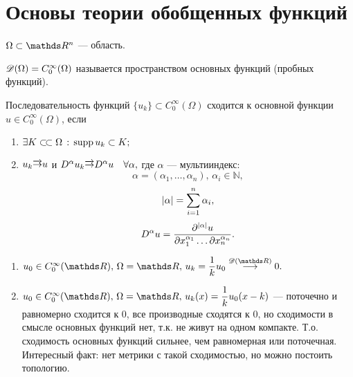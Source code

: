 
\section{Основы теории обобщенных функций}
$\Omega \subset \real^n$ --- область.

\begin{definition}
$ \mathscr{D}(\Omega) = C_0^\infty(\Omega)$ называется пространством основных функций (пробных функций).
\end{definition}

\begin{definition}
Последовательность функций $\{u_k\} \subset C_0^\infty(\Omega)$ сходится к основной функции $u \in C_0^\infty(\Omega)$, если 
\begin{enumerate}
\item $\exists K \ssubset \Omega \, : \, \supp u_k \subset K;$
\item $u_k \overrightarrow{\rightarrow} u$ и $D^\alpha u_k \overrightarrow{\rightarrow} D^\alpha u \quad \forall \alpha,$ где $\alpha$ --- мультииндекс: $$\alpha = (\alpha_1, \ldots, \alpha_n), \, \alpha_i \in \mathds{N},$$ $$\lvert\alpha\rvert = \sum\limits_{i=1}^{n}\alpha_i,$$
$$D^\alpha u = \dfrac{\partial^{\lvert\alpha\rvert}u}{\partial x_1^{\alpha_1}\ldots\partial x_n^{\alpha_n}}.$$
\end{enumerate}
\end{definition}

\begin{examples}
\begin{enumerate}
\item $u_0 \in C_0^\infty(\real), \, \Omega = \real, \, u_k = \dfrac{1}{k}u_0 \stackrel{\beauD(\real)}\longrightarrow 0.$
\item $u_0 \in C_0^\infty(\real), \, \Omega = \real, \, u_k(x) = \dfrac{1}{k}u_0(x - k)$ --- поточечно и равномерно сходится к 0, все производные сходятся к 0, но сходимости в смысле основных функций нет, т.к. не живут на одном компакте. Т.о. сходимость основных функций сильнее, чем равномерная или поточечная. Интересный факт: нет метрики с такой сходимостью, но можно постоить топологию.
\end{enumerate}
\end{examples}

